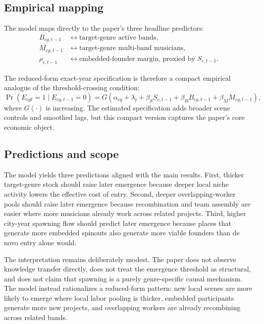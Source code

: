 \subsection*{Empirical mapping}

The model maps directly to the paper's three headline predictors:
\begin{align*}
B_{cg,t-1} &\leftrightarrow \text{target-genre active bands}, \\
M_{cg,t-1} &\leftrightarrow \text{target-genre multi-band musicians}, \\
\rho_{c,t-1} &\leftrightarrow \text{embedded-founder margin, proxied by } S_{c,t-1}.
\end{align*}

The reduced-form exact-year specification is therefore a compact empirical analogue of the
threshold-crossing condition:
\begin{equation}
\Pr(E_{cgt}=1 \mid E_{cg,t-1}=0)
=
G\!\left(
\alpha_{cg}
+ \lambda_t
+ \beta_S S_{c,t-1}
+ \beta_B B_{cg,t-1}
+ \beta_M M_{cg,t-1}
\right),
\end{equation}
where $G(\cdot)$ is increasing. The estimated specification adds broader scene controls and
smoothed lags, but this compact version captures the paper's core economic object.

\subsection*{Predictions and scope}

The model yields three predictions aligned with the main results. First, thicker target-genre
stock should raise later emergence because deeper local niche activity lowers the effective cost of
entry. Second, deeper overlapping-worker pools should raise later emergence because recombination
and team assembly are easier where more musicians already work across related projects. Third,
higher city-year spawning flow should predict later emergence because places that generate more
embedded spinouts also generate more viable founders than de novo entry alone would.

The interpretation remains deliberately modest. The paper does not observe knowledge transfer
directly, does not treat the emergence threshold as structural, and does not claim that spawning
is a purely genre-specific causal mechanism. The model instead rationalizes a reduced-form pattern:
new local scenes are more likely to emerge where local labor pooling is thicker, embedded
participants generate more new projects, and overlapping workers are already recombining across
related bands.

